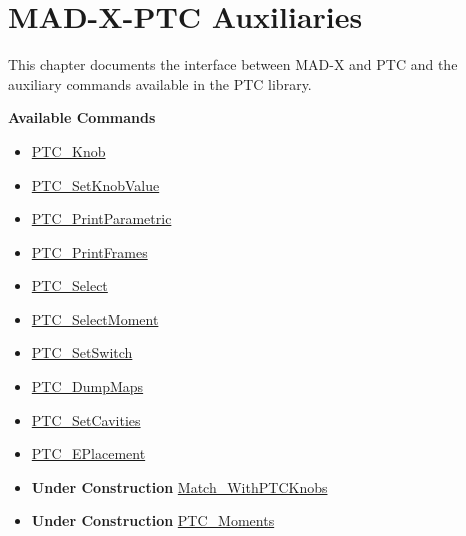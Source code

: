 
\chapter{MAD-X-PTC Auxiliaries}

This chapter documents the interface between MAD-X and PTC and the
auxiliary commands available in the PTC library.

{\bf Available Commands }
\begin{itemize}
   \item \href{PTC_Knob.html}{ PTC\_Knob}
   \item \href{PTC_SetKnobValue.html}{ PTC\_SetKnobValue}
   \item \href{PTC_PrintParametric.html}{ PTC\_PrintParametric}
   \item \href{PTC_PrintFrames.html}{ PTC\_PrintFrames}
   \item \href{PTC_Select.html}{ PTC\_Select}
   \item \href{PTC_SelectMoment.html}{ PTC\_SelectMoment}
   \item \href{PTC_SetSwitch.html}{ PTC\_SetSwitch}
   \item \href{PTC_DumpMaps.html}{  PTC\_DumpMaps}
   \item \href{PTC_SetCavities.html}{ PTC\_SetCavities}
   \item \href{PTC_EPlacement.html}{ PTC\_EPlacement}
   \item {\bf Under Construction} \href{Match_WithPTCKnobs.html}{ Match\_WithPTCKnobs}
   \item {\bf Under Construction} \href{PTC_Moments.html}{ PTC\_Moments}
\end{itemize}

\newpage













